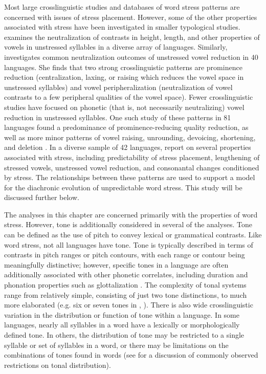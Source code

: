   Most large crosslinguistic studies and databases of word stress patterns are concerned with issues of stress placement. However, some of the other properties associated with stress have been investigated in smaller typological studies. \citet{Barnes2006} examines the neutralization of contrasts in height, length, and other properties of vowels in unstressed syllables in a diverse array of languages. Similarly, \citet{Crosswhite2001} investigates common neutralization outcomes of unstressed vowel reduction in 40 languages. She finds that two strong crosslinguistic patterns are prominence reduction (centralization, laxing, or raising which reduces the vowel space in unstressed syllables) and vowel peripheralization (neutralization of vowel contrasts to a few peripheral qualities of the vowel space). Fewer crosslinguistic studies have focused on phonetic (that is, not necessarily neutralizing) vowel reduction in unstressed syllables. One such study of these patterns in 81 languages found a predominance of prominence-reducing quality reduction, as well as more minor patterns of vowel raising, unrounding, devoicing, shortening, and deletion \citep{KapatsinskiEtAl2019}. In a diverse sample of 42 languages, \citet{BybeeEtAl1998} report on several properties associated with stress, including predictability of stress placement, lengthening of stressed vowels, unstressed vowel reduction, and consonantal changes conditioned by stress. The relationships between these patterns are used to support a model for the diachronic evolution of unpredictable word stress. This study will be discussed further below.

  The analyses in this chapter are concerned primarily with the properties of word stress. However, tone is additionally considered in several of the analyses. Tone can be defined as the use of pitch to convey lexical or grammatical contrasts. Like word stress, not all languages have tone. Tone is typically described in terms of contrasts in pitch ranges or pitch contours, with each range or contour being meaningfully distinctive; however, specific tones in a language are often additionally associated with other phonetic correlates, including duration and phonation properties such as glottalization \citep[477--481]{Laver1994}. The complexity of tonal systems range from relatively simple, consisting of just two tone distinctions, to much more elaborated (e.g. six or seven tones in , \citealt{BauerBenedict1997}). There is also wide crosslinguistic variation in the distribution or function of tone within a language. In some languages, nearly all syllables in a word have a lexically or morphologically defined tone. In others, the distribution of tone may be restricted to a single syllable or set of syllables in a word, or there may be limitations on the combinations of tones found in words (see \citealt{Hyman2009} for a discussion of commonly observed restrictions on tonal distribution). 

